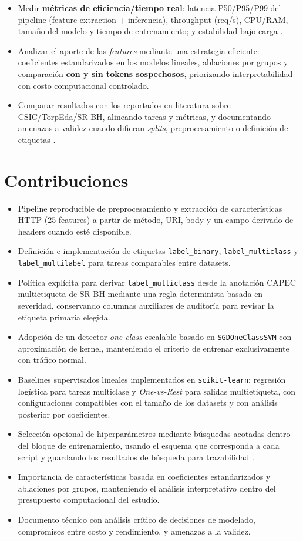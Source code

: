 \documentclass[12pt,oneside]{report}
\begin{document}
\begin{itemize}[leftmargin=*]
  \item Medir \textbf{métricas de eficiencia/tiempo real}: latencia P50/P95/P99 del pipeline (feature extraction + inferencia), throughput (req/s), CPU/RAM, tamaño del modelo y tiempo de entrenamiento; y estabilidad bajo carga \cite{ocswaf_zenodo}.
  \item Analizar el aporte de las \textit{features} mediante una estrategia eficiente: coeficientes estandarizados en los modelos lineales, ablaciones por grupos y comparación \textbf{con y sin tokens sospechosos}, priorizando interpretabilidad con costo computacional controlado.
  \item Comparar resultados con los reportados en literatura sobre CSIC/TorpEda/SR-BH, alineando tareas y métricas, y documentando amenazas a validez cuando difieran \textit{splits}, preprocesamiento o definición de etiquetas \cite{riverol_2024,fang_2024,zhou_2024}.
\end{itemize}

\section{Contribuciones}
\begin{itemize}[leftmargin=*]
  \item Pipeline reproducible de preprocesamiento y extracción de características HTTP (25 features) a partir de método, URI, body y un campo derivado de headers cuando esté disponible.
  \item Definición e implementación de etiquetas \texttt{label\_binary}, \texttt{label\_multiclass} y \texttt{label\_multilabel} para tareas comparables entre datasets.
  \item Política explícita para derivar \texttt{label\_multiclass} desde la anotación CAPEC multietiqueta de SR-BH mediante una regla determinista basada en severidad, conservando columnas auxiliares de auditoría para revisar la etiqueta primaria elegida.
  \item Adopción de un detector \textit{one-class} escalable basado en \texttt{SGDOneClassSVM} con aproximación de kernel, manteniendo el criterio de entrenar exclusivamente con tráfico normal.
  \item Baselines supervisados lineales implementados en \texttt{scikit-learn}: regresión logística para tareas multiclase y \textit{One-vs-Rest} para salidas multietiqueta, con configuraciones compatibles con el tamaño de los datasets y con análisis posterior por coeficientes.
  \item Selección opcional de hiperparámetros mediante búsquedas acotadas dentro del bloque de entrenamiento, usando el esquema que corresponda a cada script y guardando los resultados de búsqueda para trazabilidad \cite{sklearn_randomsearch,sklearn_halving}.
  \item Importancia de características basada en coeficientes estandarizados y ablaciones por grupos, manteniendo el análisis interpretativo dentro del presupuesto computacional del estudio.
  \item Documento técnico con análisis crítico de decisiones de modelado, compromisos entre costo y rendimiento, y amenazas a la validez.
\end{itemize}
\end{document}
